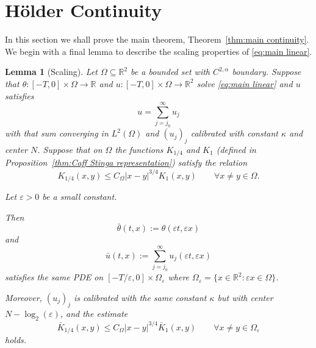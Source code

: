 \documentclass[11pt]{amsart}
\newtheorem{lemma}[theorem]{Lemma}
\theoremstyle{remark}
\theoremstyle{definition}
\newcommand{\R}{\mathbb{R}}
\newcommand{\eps}{\varepsilon}
\newcommand{\norm}[1]{\left\lVert#1\right\rVert}
\newcommand{\Comega}{C_\Omega}
\begin{document}

\section{H\"{o}lder Continuity} \label{sec:holder}

In this section we shall prove the main theorem, Theorem~\ref{thm:main continuity}.  We begin with a final lemma to describe the scaling properties of \eqref{eq:main linear}.  

\begin{lemma}[Scaling] \label{thm:scaling}
Let $\Omega \subseteq \R^2$ be a bounded set with $C^{2,\alpha}$ boundary.  Suppose that $\theta:[-T,0] \times \Omega \to \R$ and $u:[-T,0]\times \Omega \to \R^2$ solve \eqref{eq:main linear} and $u$ satisfies
\[ u = \sum_{j=j_0}^\infty u_j \]
with that sum converging in $L^2(\Omega)$ and $(u_j)_j$ calibrated with constant $\kappa$ and center $N$.  Suppose that on $\Omega$ the functions $K_{1/4}$ and $K_1$ (defined in Proposition~\ref{thm:Caff Stinga representation}) satisfy the relation
\begin{equation} \label{scaling 1/4 to 1 property} K_{1/4}(x,y) \leq \Comega |x-y|^{3/4} K_1(x,y) \qquad \forall x\neq y \in \Omega. \end{equation}

Let $\eps>0$ be a small constant. 

Then
\[ \bar{\theta}(t,x) := \theta(\eps t, \eps x) \]
and
\[ \bar{u}(t,x) := \sum_{j=j_0}^\infty u_j(\eps t, \eps x) \]
satisfies the same PDE on $[-T/\eps, 0]\times \Omega_\eps$ where $\Omega_\eps = \{x \in \R^2: \eps x \in \Omega\}$.  

Moreover, $(u_j)_j$ is calibrated with the same constant $\kappa$ but with center $N - \log_2(\eps)$, and the estimate
\[ \bar{K}_{1/4}(x,y) \leq \Comega |x-y|^{3/4} \bar{K}_1(x,y) \qquad \forall x\neq y \in \Omega_\eps \]
holds.  

\end{lemma}
\end{document}
